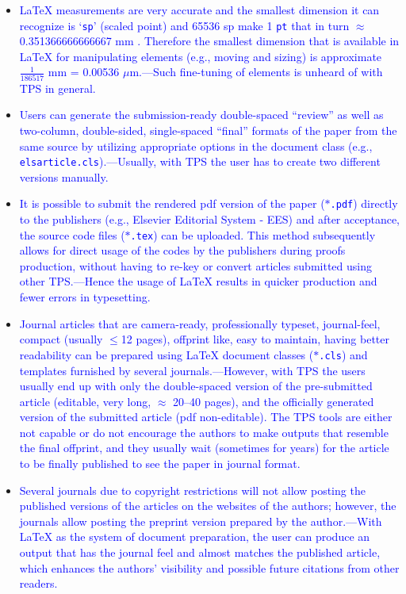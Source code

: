\documentclass[phd]{ndsu-thesis-2022}
\newcommand\italk[1]{\textcolor{blue}{#1}}  %
\newcommand\lx{\LaTeX\xspace}
\newcommand\vb[1]{\textcolor{blue}{\texttt{#1}}}%
\begin{document}
\begin{itemize}[leftmargin=*, itemsep=0pt, parsep=3pt]
\item \italk{\lx measurements are very accurate and the smallest dimension it can recognize is `\vb{sp}' (scaled point) and 65536 sp make 1 \vb{pt} that in turn $\approx$ 0.351366666666667 mm \citep{Wikibook2016}. Therefore the smallest dimension that is available in \lx for manipulating elements (e.g., moving and sizing) is approximate $\frac{1}{186517}$ mm = 0.00536 $\mu$m.---Such fine-tuning of elements is unheard of with TPS in general.} 

\item \italk{Users can generate the submission-ready double-spaced ``review'' as well as two-column, double-sided, single-spaced ``final'' formats of the paper from the same source by utilizing appropriate options in the document class (e.g., \vb{elsarticle.cls}).---Usually, with TPS the user has to create two different versions manually.}   

\item \italk{It is possible to submit the rendered pdf version of the paper ($\ast$\vb{.pdf}) directly to the publishers (e.g., Elsevier Editorial System - EES) and after acceptance, the source code files ($\ast$\vb{.tex}) can be uploaded.  This method subsequently allows for direct usage of the codes by the publishers during proofs production, without having to re-key or convert articles submitted using other TPS.---Hence the usage of \lx results in quicker production and fewer errors in typesetting.}   

\item \italk{Journal articles that are camera-ready, professionally typeset, journal-feel, compact (usually $\le$12 pages), offprint like, easy to maintain, having better readability can be prepared using \lx document classes ($\ast$\vb{.cls}) and templates furnished by several journals.---However, with TPS the users usually end up with only the double-spaced version of the pre-submitted article (editable, very long, $\approx$ 20--40 pages), and the officially generated version of the submitted article (pdf non-editable). The TPS tools are either not capable or do not encourage the authors to make outputs that resemble the final offprint, and they usually wait (sometimes for years) for the article to be finally published to see the paper in journal format.}    

\item \italk{Several journals due to copyright restrictions will not allow posting the published versions of the articles on the websites of the authors; however, the journals allow posting the preprint version prepared by the author.---With \lx as the system of document preparation, the user can produce an output that has the journal feel and almost matches the published article, which enhances the authors' visibility and possible future citations from other readers.}  


\end{itemize}
\end{document}
